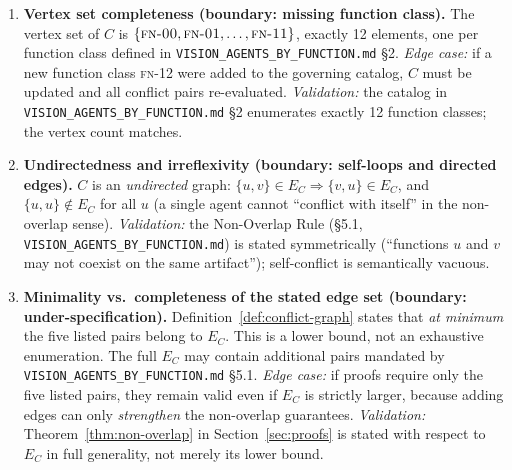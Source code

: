 \documentclass[12pt]{article}
\theoremstyle{definition}
\newcommand{\code}[1]{\texttt{#1}}
\newcommand{\FN}[1]{\textsc{fn-#1}}
\newcommand{\VisionFunc}{\code{VISION\_AGENTS\_\allowbreak BY\_FUNCTION.md}}
\begin{document}
\begin{enumerate}[label=\textbf{C\arabic*.}, leftmargin=*, widest=C9]

  \item \textbf{Vertex set completeness (boundary: missing function
        class).}
        The vertex set of $C$ is
        $\{\FN{00}, \FN{01}, \ldots, \FN{11}\}$, exactly 12 elements,
        one per function class defined in \VisionFunc{} \S2.
        \emph{Edge case:} if a new function class \FN{12} were added
        to the governing catalog, $C$ must be updated and all conflict
        pairs re-evaluated.
        \emph{Validation:} the catalog in \VisionFunc{} \S2 enumerates
        exactly 12 function classes; the vertex count matches.

  \item \textbf{Undirectedness and irreflexivity (boundary: self-loops
        and directed edges).}
        $C$ is an \emph{undirected} graph:
        $\{u,v\} \in E_C \Rightarrow \{v,u\} \in E_C$, and
        $\{u,u\} \notin E_C$ for all $u$ (a single agent cannot
        ``conflict with itself'' in the non-overlap sense).
        \emph{Validation:} the Non-Overlap Rule (\S5.1, \VisionFunc{})
        is stated symmetrically (``functions $u$ and $v$ may not
        coexist on the same artifact''); self-conflict is
        semantically vacuous.

  \item \textbf{Minimality vs.\ completeness of the stated edge set
        (boundary: under-specification).}
        Definition~\ref{def:conflict-graph} states that
        \emph{at minimum} the five listed pairs belong to $E_C$.
        This is a lower bound, not an exhaustive enumeration.
        The full $E_C$ may contain additional pairs mandated by
        \VisionFunc{} \S5.1.
        \emph{Edge case:} if proofs require only the five listed
        pairs, they remain valid even if $E_C$ is strictly larger,
        because adding edges can only \emph{strengthen} the
        non-overlap guarantees.
        \emph{Validation:} Theorem~\ref{thm:non-overlap} in
        Section~\ref{sec:proofs} is stated with respect to
        $E_C$ in full generality, not merely its lower bound.


\end{enumerate}
\end{document}
